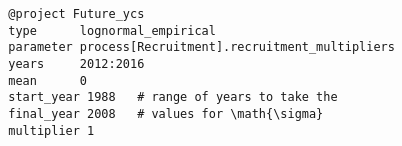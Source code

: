 {\small{\begin{verbatim}
		@project Future_ycs
		type      lognormal_empirical
		parameter process[Recruitment].recruitment_multipliers
		years     2012:2016
		mean      0
		start_year 1988   # range of years to take the
		final_year 2008   # values for \math{\sigma}
		multiplier 1
		\end{verbatim}}}







